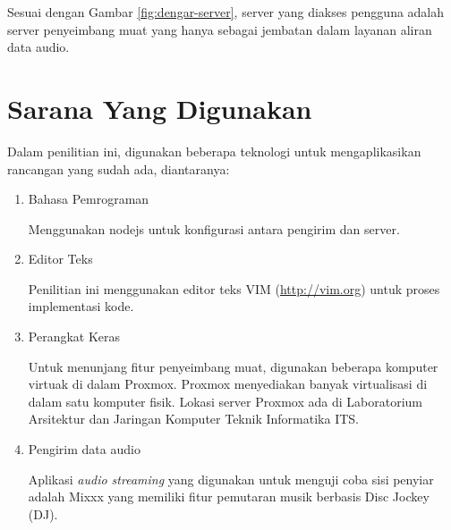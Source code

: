 Sesuai dengan Gambar \ref{fig:dengar-server}, server yang diakses pengguna adalah server penyeimbang muat yang hanya sebagai jembatan dalam layanan aliran data audio. 

\section{Sarana Yang Digunakan}

Dalam penilitian ini, digunakan beberapa teknologi untuk mengaplikasikan rancangan yang sudah ada, diantaranya:

\begin{enumerate}
    \item Bahasa Pemrograman
    
    Menggunakan nodejs untuk konfigurasi antara pengirim dan server.
    
    \item Editor Teks
    
    Penilitian ini menggunakan editor teks VIM (\url{http://vim.org}) untuk proses implementasi kode.
    
    \item Perangkat Keras
    
    Untuk menunjang fitur penyeimbang muat, digunakan beberapa komputer virtuak di dalam Proxmox. Proxmox menyediakan banyak virtualisasi di dalam satu komputer fisik. Lokasi server Proxmox ada di Laboratorium Arsitektur dan Jaringan Komputer Teknik Informatika ITS.
    
    \item Pengirim data audio
    
    Aplikasi \textit{audio streaming} yang digunakan untuk menguji coba sisi penyiar adalah Mixxx yang memiliki fitur pemutaran musik berbasis Disc Jockey (DJ).
    \end{enumerate}
